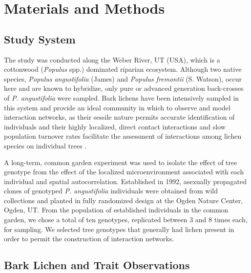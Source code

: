 \documentclass[fleqn,12pt]{olplainarticle}
\begin{document}
\section*{Materials and Methods}


\subsection*{Study System}

The study was conducted along the Weber River, UT (USA), which is a
cottonwood (\textit{Populus} spp.) dominated riparian
ecosystem. Although two native species, \textit{Populus angustifolia}
(James) and \textit{Populus fremontii} (S. Watson), occur here and are
known to hybridize, only pure or advanced generation back-crosses of
\textit{P. angustifolia} were sampled. Bark lichens have been
intensively sampled in this system and provide an ideal community in
which to observe and model interaction networks, as their sessile
nature permits accurate identification of individuals and their highly
localized, direct contact interactions and slow population turnover
rates facilitate the assessment of interactions among lichen species
on individual trees \citep{Lamit2015a}.

A long-term, common garden experiment was used to isolate the effect
of tree genotype from the effect of the localized microenvironment
associated with each individual and spatial
autocorrelation. Established in 1992, asexually propagated clones of
genotyped \textit{P. angustifolia} individuals were obtained from wild
collections and planted in fully randomized design at the Ogden Nature
Center, Ogden, UT. From the population of established individuals in
the common garden, we chose a total of ten genotypes, replicated
between 3 and 8 times each, for sampling. We selected tree genotypes
that generally had lichen present in order to permit the construction
of interaction networks.



\subsection*{Bark Lichen and Trait Observations}
\end{document}
